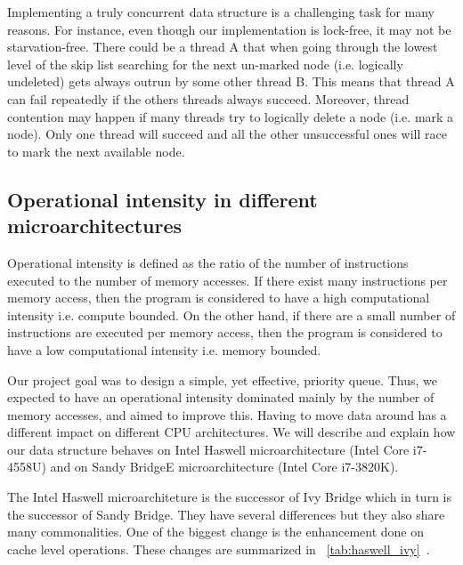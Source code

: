 Implementing a truly concurrent data structure is a challenging task for many reasons. For instance, even though our implementation is lock-free, it may not be starvation-free. There could be a thread A that when going through the lowest level of the skip list searching for the next un-marked node (i.e. logically undeleted) gets always outrun by some other thread B. This means that thread A can fail repeatedly if the others threads always succeed. Moreover, thread contention may happen if many threads try to logically delete a node (i.e. mark a node). Only one thread will succeed and all the other unsuccessful ones will race to mark
the next available node.\\

\subsection{Operational intensity in different microarchitectures}
Operational intensity is defined as the ratio of the number of instructions executed to the number of memory accesses. If there exist many instructions per memory access, then the program is considered to have a high computational intensity i.e. compute bounded. On the other hand, if there are a small number of instructions are executed per memory access, then the program is considered to have a low computational intensity i.e. memory bounded.

Our project goal was to design a simple, yet effective, priority queue. Thus, we expected to have an operational intensity dominated mainly by the number of memory accesses, and aimed to improve this. Having to move data around has a different impact on different CPU architectures. We will describe and explain how our data structure behaves on Intel Haswell microarchitecture (Intel Core i7-4558U) and on Sandy BridgeE microarchitecture (Intel Core i7-3820K). 

The Intel Haswell microarchiteture is the successor of Ivy Bridge which in turn is the successor of Sandy Bridge. They have several differences but they also share many commonalities. One of the biggest change is the enhancement done on cache level operations. These changes are summarized in \tablename~\ref{tab:haswell_ivy}~\cite{ijcsit2013040321, microarchitecture, haswell_arch}.


